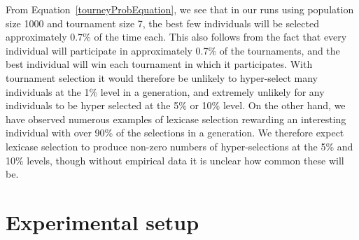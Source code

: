 \documentclass{sig-alternate}
\begin{document}

From Equation~\ref{tourneyProbEquation}, we see that in our runs using population size 1000 and tournament size 7, the best few individuals will be selected approximately 0.7\% of the time each. This also follows from the fact that every individual will participate in approximately 0.7\% of the tournaments, and the best individual will win each tournament in which it participates.
With tournament selection it would therefore be unlikely to hyper-select many individuals at the 1\% level in a generation, and extremely unlikely for any individuals to be hyper selected at the 5\% or 10\% level.
On the other hand, we have observed numerous examples of lexicase selection rewarding an interesting individual with over 90\% of the selections in a generation. We therefore expect lexicase selection to produce non-zero numbers of hyper-selections at the 5\% and 10\% levels, though without empirical data it is unclear how common these will be.

\section{Experimental setup}
\label{section:experiments}
\end{document}
